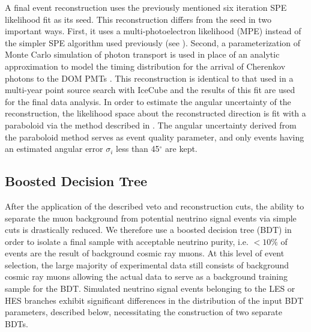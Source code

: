 \documentclass[manuscript]{aastex}
\begin{document}
A final event reconstruction uses the previously mentioned six iteration SPE likelihood fit as its seed. This reconstruction differs from the seed in two important ways. First, it uses a multi-photoelectron likelihood (MPE) instead of the simpler SPE algorithm used previously (see \cite{2004NIMPA.524..169A}). Second, a parameterization of Monte Carlo simulation of photon transport is used in place of an analytic approximation to model the timing distribution for the arrival of Cherenkov photons to the DOM PMTs \citep{2013CoPhC.184.2214W}. This reconstruction is identical to that used in a multi-year point source search with IceCube \citep{2014ApJ...796..109A} and the results of this fit are used for the final data analysis. In order to estimate the angular uncertainty of the reconstruction, the likelihood space about the reconstructed direction is fit with a paraboloid via the method described in \cite{2006APh....25..220N}. The angular uncertainty derived from the paraboloid method serves as event quality parameter, and only events having an estimated angular error $\sigma_i$ less than 45$^{\circ}$ are kept.
 
\subsection{Boosted Decision Tree}
After the application of the described veto and reconstruction cuts, the ability to separate the muon background from potential neutrino signal events via simple cuts is drastically reduced. We therefore use a boosted decision tree (BDT) in order to isolate a final sample with acceptable neutrino purity, i.e. $<10 \%$ of events are the result of background cosmic ray muons. At this level of event selection, the large majority of experimental data still consists of background cosmic ray muons allowing the actual data to serve as a background training sample for the BDT. Simulated neutrino signal events belonging to the LES or HES branches exhibit significant differences in the distribution of the input BDT parameters, described below, necessitating the construction of two separate BDTs. 
\end{document}
